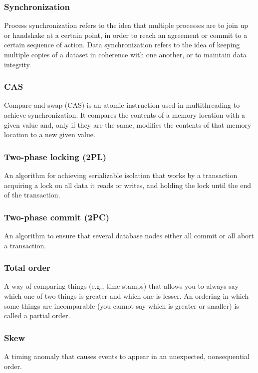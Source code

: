 \documentclass{article}
\begin{document}
    \subsubsection{Synchronization}
    Process synchronization refers to the idea that multiple processes are to join up or handshake at a certain point, in order to reach an agreement or commit to a certain sequence of action. Data synchronization refers to the idea of keeping multiple copies of a dataset in coherence with one another, or to maintain data integrity.
    
    \subsubsection{CAS}
    Compare-and-swap (CAS) is an atomic instruction used in multithreading to achieve synchronization. It compares the contents of a memory location with a given value and, only if they are the same, modifies the contents of that memory location to a new given value.
    
    \subsubsection{Two-phase locking (2PL)}
    An algorithm for achieving serializable isolation that works by a transaction acquiring a lock on all data it reads or writes, and holding the lock until the end of the transaction.
    
    \subsubsection{Two-phase commit (2PC)}
    An algorithm to ensure that several database nodes either all commit or all abort a transaction.
    
    \subsubsection{Total order}
    A way of comparing things (e.g., time-stamps) that allows you to always say which one of two things is greater and which one is lesser. An ordering in which some things are incomparable (you cannot say which is greater or smaller) is called a partial order.
    
    \subsubsection{Skew}
    A timing anomaly that causes events to appear in an unexpected, nonsequential order.
\end{document}
